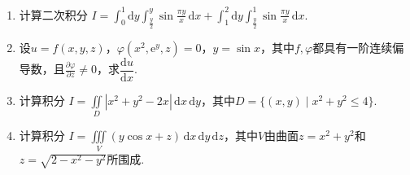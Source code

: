 \documentclass[../main.tex]{subfiles}
\begin{document}
\begin{enumerate}
    \item 计算二次积分
          \(
          I=\int_0^1\mathrm{d}y\int_{\frac{y}{2}}^y\sin\frac{\pi y}{x}\,\mathrm{d}x
          +\int_1^2\mathrm{d}y\int_{\frac{y}{2}}^1\sin\frac{\pi y}{x}\,\mathrm{d}x.
          \)
          \vspace{10em}

    \item 设$u=f(x,y,z)$，$\varphi(x^2,\mathrm{e}^y,z)=0$，$y=\sin x$，其中$f,\varphi$都具有一阶连续偏导数，且$\frac{\partial\varphi}{\partial z}\neq0$，求$\dfrac{\mathrm{d}u}{\mathrm{d}x}$.
          \vspace{10em}

    \item 计算积分
          \(
          I=\iint\limits_D |x^2+y^2-2x|\,\mathrm{d}x\,\mathrm{d}y
          \)，其中$D=\{(x,y)\mid x^2+y^2\le4\}$.
          \vspace{10em}

    \item 计算积分
          \(
          I=\iiint\limits_V(y\cos x+z)\,\mathrm{d}x\,\mathrm{d}y\,\mathrm{d}z
          \)，其中$V$由曲面$z=x^2+y^2$和$z=\sqrt{2-x^2-y^2}$所围成.
          \vspace{10em}
\end{enumerate}
\end{document}
